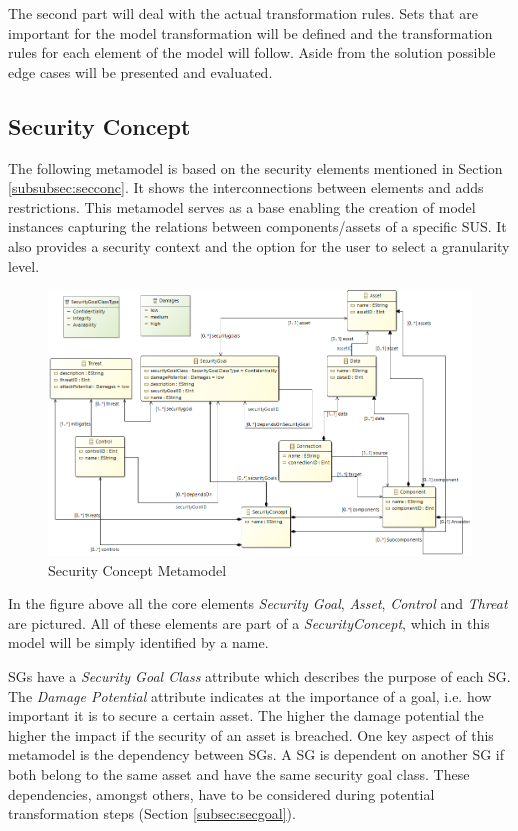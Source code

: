 The second part will deal with the actual transformation rules. Sets that are important for the model transformation will be defined and the transformation rules for each element of the model will follow. Aside from the solution possible edge cases will be presented and evaluated.

\label{sec:approach}
\subsection{Security Concept}
\label{subsec:sec_concept}
The following metamodel is based on the security elements mentioned in Section \ref{subsubsec:secconc}. It shows the interconnections between elements and adds restrictions. This metamodel serves as a base enabling the creation of model instances capturing the relations between components/assets of a specific SUS. It also provides a security context and the option for the user to select a granularity level. 

\begin{figure}[H]
\centering
\includegraphics[width=1.2\textwidth]{pictures/concept_metamodel.png}
\caption{Security Concept Metamodel}
\label{fig:concept_metamodel}
\end{figure}

In the figure above all the core elements \textit{Security Goal}, \textit{Asset}, \textit{Control} and \textit{Threat} are pictured. All of these elements are part of a \textit{SecurityConcept}, which in this model will be simply identified by a name. 

SGs have a \textit{Security Goal Class} attribute which describes the purpose of each SG. The \textit{Damage Potential} attribute indicates at the importance of a goal, i.e. how important it is to secure a certain asset. The higher the damage potential the higher the impact if the security of an asset is breached. One key aspect of this metamodel is the dependency between SGs. A SG is dependent on another SG if both belong to the same asset and have the same security goal class. These dependencies, amongst others, have to be considered during potential transformation steps (Section \ref{subsec:secgoal}). 

